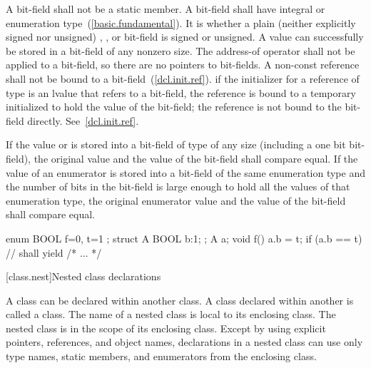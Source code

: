 \pnum
{}%
A bit-field shall not be a static member. A bit-field shall have
integral or enumeration type~(\ref{basic.fundamental}).
%
It is  whether a plain (neither
explicitly signed nor unsigned) , , 
or 
bit-field is signed or unsigned.
%
A  value can successfully be stored in a bit-field of any
nonzero size.
%
The address-of operator \tcode{\&} shall not be applied to a bit-field,
so there are no pointers to bit-fields.
%
%
%
A non-const reference shall not be bound to a
bit-field~(\ref{dcl.init.ref}).
\enternote
if the initializer for a reference of type   is
an lvalue that refers to a bit-field, the reference is bound to a
temporary initialized to hold the value of the bit-field; the reference
is not bound to the bit-field directly. See~\ref{dcl.init.ref}.
\exitnote

\pnum
If the value  or  is stored into a bit-field of
type  of any size (including a one bit bit-field), the
original  value and the value of the bit-field shall compare
equal. If the value of an enumerator is stored into a bit-field of the
same enumeration type and the number of bits in the bit-field is large
enough to hold all the values of that enumeration type,
the original enumerator value and the value of the bit-field shall
compare equal.
\enterexample

\begin{codeblock}
enum BOOL { f=0, t=1 };
struct A {
	BOOL b:1;
};
A a;
void f() {
	a.b = t;
	if (a.b == t)		// shall yield 
	{ /* ... */ }
}
\end{codeblock}
\exitexampleb

[class.nest]{Nested class declarations}%
%
%

\pnum
A class can be declared within another class. A class declared within
another is called a  class. The name of a nested class
is local to its enclosing class. The nested class is in the scope of its
enclosing class. Except by using explicit pointers,
references, and object names,
%
declarations in a nested class can use only type names, static members,
and enumerators from the enclosing class.
%
\enterexample

